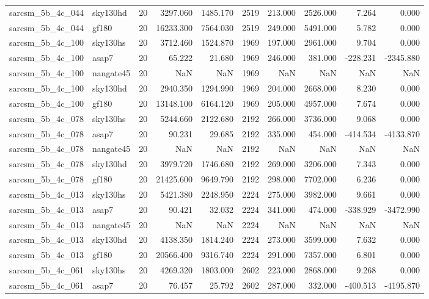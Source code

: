 \begin{tabular}{llrrrrrrrr}
sarcsm\_5b\_4c\_044 & sky130hd & 20 & 3297.060 & 1485.170 & 2519 & 213.000 & 2526.000 & 7.264 & 0.000 \\
sarcsm\_5b\_4c\_044 & gf180 & 20 & 16233.300 & 7564.030 & 2519 & 249.000 & 5491.000 & 5.782 & 0.000 \\
sarcsm\_5b\_4c\_100 & sky130hs & 20 & 3712.460 & 1524.870 & 1969 & 197.000 & 2961.000 & 9.704 & 0.000 \\
sarcsm\_5b\_4c\_100 & asap7 & 20 & 65.222 & 21.680 & 1969 & 246.000 & 381.000 & -228.231 & -2345.880 \\
sarcsm\_5b\_4c\_100 & nangate45 & 20 & NaN & NaN & 1969 & NaN & NaN & NaN & NaN \\
sarcsm\_5b\_4c\_100 & sky130hd & 20 & 2940.350 & 1294.990 & 1969 & 204.000 & 2668.000 & 8.230 & 0.000 \\
sarcsm\_5b\_4c\_100 & gf180 & 20 & 13148.100 & 6164.120 & 1969 & 205.000 & 4957.000 & 7.674 & 0.000 \\
sarcsm\_5b\_4c\_078 & sky130hs & 20 & 5244.660 & 2122.680 & 2192 & 266.000 & 3736.000 & 9.068 & 0.000 \\
sarcsm\_5b\_4c\_078 & asap7 & 20 & 90.231 & 29.685 & 2192 & 335.000 & 454.000 & -414.534 & -4133.870 \\
sarcsm\_5b\_4c\_078 & nangate45 & 20 & NaN & NaN & 2192 & NaN & NaN & NaN & NaN \\
sarcsm\_5b\_4c\_078 & sky130hd & 20 & 3979.720 & 1746.680 & 2192 & 269.000 & 3206.000 & 7.343 & 0.000 \\
sarcsm\_5b\_4c\_078 & gf180 & 20 & 21425.600 & 9649.790 & 2192 & 298.000 & 7702.000 & 6.236 & 0.000 \\
sarcsm\_5b\_4c\_013 & sky130hs & 20 & 5421.380 & 2248.950 & 2224 & 275.000 & 3982.000 & 9.661 & 0.000 \\
sarcsm\_5b\_4c\_013 & asap7 & 20 & 90.421 & 32.032 & 2224 & 341.000 & 474.000 & -338.929 & -3472.990 \\
sarcsm\_5b\_4c\_013 & nangate45 & 20 & NaN & NaN & 2224 & NaN & NaN & NaN & NaN \\
sarcsm\_5b\_4c\_013 & sky130hd & 20 & 4138.350 & 1814.240 & 2224 & 273.000 & 3599.000 & 7.632 & 0.000 \\
sarcsm\_5b\_4c\_013 & gf180 & 20 & 20566.400 & 9316.740 & 2224 & 291.000 & 7357.000 & 6.801 & 0.000 \\
sarcsm\_5b\_4c\_061 & sky130hs & 20 & 4269.320 & 1803.000 & 2602 & 223.000 & 2868.000 & 9.268 & 0.000 \\
sarcsm\_5b\_4c\_061 & asap7 & 20 & 76.457 & 25.792 & 2602 & 287.000 & 332.000 & -400.513 & -4195.870 \\

\end{tabular}
